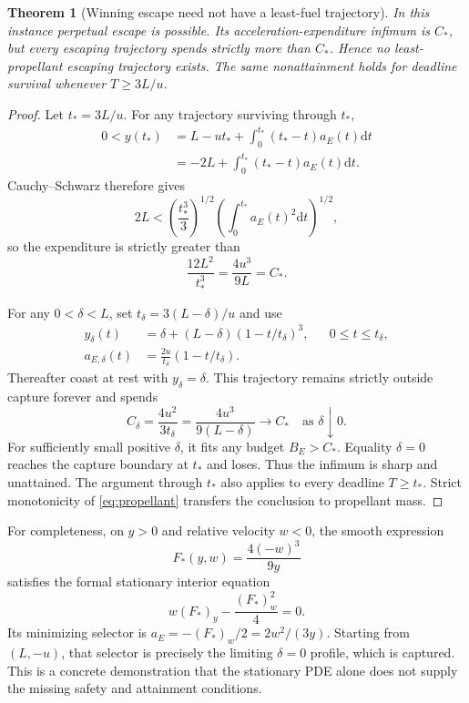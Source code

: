 \documentclass[journal,a4paper]{IEEEtran}
\newtheorem{theorem}{Theorem}
\newcommand{\dd}{\mathrm d}
\begin{document}
\begin{theorem}[Winning escape need not have a least-fuel trajectory]
\label{thm:nonattain}
In this instance perpetual escape is possible. Its acceleration-expenditure infimum is $C_*$, but every escaping trajectory spends strictly more than $C_*$. Hence no least-propellant escaping trajectory exists. The same nonattainment holds for deadline survival whenever $T\ge3L/u$.
\end{theorem}
\begin{proof}
Let $t_*=3L/u$. For any trajectory surviving through $t_*$,
\begin{align}
 0<y(t_*)&=L-ut_*+\int_0^{t_*}(t_*-t)a_E(t)\dd t\\
 &=-2L+\int_0^{t_*}(t_*-t)a_E(t)\dd t.\nonumber
\end{align}
Cauchy--Schwarz therefore gives
\begin{equation}
 2L<\left(\frac{t_*^3}{3}\right)^{1/2}
          \left(\int_0^{t_*}a_E(t)^2\dd t\right)^{1/2},
\end{equation}
so the expenditure is strictly greater than
\begin{equation}
 \frac{12L^2}{t_*^3}=\frac{4u^3}{9L}=C_*.
\end{equation}

For any $0<\delta<L$, set $t_\delta=3(L-\delta)/u$ and use
\begin{align}
 y_\delta(t)&=\delta+(L-\delta)(1-t/t_\delta)^3,
                                      &&0\le t\le t_\delta,\label{eq:escapeprofile}\\
 a_{E,\delta}(t)&=\frac{2u}{t_\delta}(1-t/t_\delta).
\end{align}
Thereafter coast at rest with $y_\delta=\delta$. This trajectory remains strictly outside capture forever and spends
\begin{equation}
 C_\delta=\frac{4u^2}{3t_\delta}
         =\frac{4u^3}{9(L-\delta)}\longrightarrow C_*
         \quad\text{as }\delta\downarrow0.
\end{equation}
For sufficiently small positive $\delta$, it fits any budget $B_E>C_*$. Equality $\delta=0$ reaches the capture boundary at $t_*$ and loses. Thus the infimum is sharp and unattained. The argument through $t_*$ also applies to every deadline $T\ge t_*$. Strict monotonicity of \eqref{eq:propellant} transfers the conclusion to propellant mass.
\end{proof}

For completeness, on $y>0$ and relative velocity $w<0$, the smooth expression
\begin{equation}
 F_*(y,w)=\frac{4(-w)^3}{9y}
\end{equation}
satisfies the formal stationary interior equation
\begin{equation}
 w(F_*)_y-\frac{(F_*)_w^2}{4}=0.
\end{equation}
Its minimizing selector is $a_E=-(F_*)_w/2=2w^2/(3y)$. Starting from $(L,-u)$, that selector is precisely the limiting $\delta=0$ profile, which is captured. This is a concrete demonstration that the stationary PDE alone does not supply the missing safety and attainment conditions.
\end{document}
